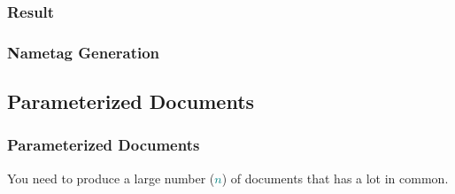 {\subsubsection{Result}
\begin{frame}[fragile]
  \frametitle{Nametag Generation }
  \vspace{3mm}
\end{frame}

\subsection{Parameterized Documents}
\begin{frame}[fragile]
  \frametitle{Parameterized Documents}
  \pause
  \vspace{2mm}
  You need to produce a large number (\textcolor{teal}{$n$}) of documents that has a lot in common.
  

\end{frame}}
